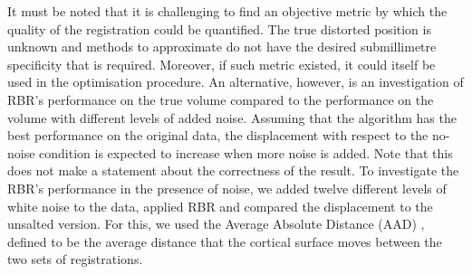 It must be noted that it is challenging to find an objective metric by which the quality of the registration could be quantified. The true distorted position is unknown and methods to approximate do not have the desired submillimetre specificity that is required. Moreover, if such metric existed, it could itself be used in the optimisation procedure. An alternative, however, is an investigation of RBR's performance on the true volume compared to the performance on the volume with different levels of added noise. Assuming that the algorithm has the best performance on the original data, the displacement with respect to the no-noise condition is expected to increase when more noise is added. Note that this does not make a statement about the correctness of the result. To investigate the RBR's performance in the presence of noise, we added twelve different levels of white noise to the data, applied RBR and compared the displacement to the unsalted version. For this, we used the Average Absolute Distance (AAD) \citep{Greve2009}, defined to be the average distance that the cortical surface moves between the two sets of registrations.
